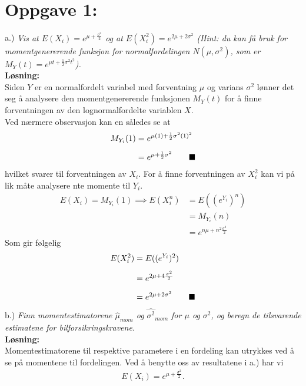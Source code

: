 \documentclass[12pt,
               a4paper,
               article,
               oneside,
               oldfontcommands,
               norsk]{memoir}
\newcommand{\Q}{ \qquad \hfill \blacksquare}
\begin{document}
\section*{Oppgave 1:}
a.) \emph{Vis at $E(X_i) = e^{\mu + \frac{\sigma^2}{2}}$ og at 
    $E(X_{i}^{2}) = e^{2\mu + 2\sigma^2}$ 
(Hint: du kan få bruk for momentgenererende funksjon for normalfordelingen 
$N(\mu, \sigma^2)$, som er $M_{Y}(t) = e^{\mu t+ \frac{1}{2} \sigma^2 t^2}$).}\vspace{3mm}\\
\textbf{Løsning:}\vspace{3mm}\\
Siden $Y$ er en normalfordelt variabel med forventning $\mu$ og varians $\sigma^2$ lønner det seg å analysere den momentgenererende funksjonen $M_{Y}(t)$ for å finne forventningen av den lognormalfordelte variablen $X$.\\
    Ved nærmere observasjon kan en således se at 
\begin{align*}
        M_{Y_i}(1) &= e^{\mu (1) + \frac{1}{2}\sigma^2(1)^2}\\[5pt]
                   &= e^{\mu + \frac{1}{2}\sigma^2}  \Q
\end{align*}
hvilket svarer til forventningen av $X_i$. For å finne forventningen av $X_{i}^2$ kan vi på lik måte analysere nte momente til $Y_i$.
\begin{align*}
E(X_{i}) = M_{Y_{i}}(1) \implies E(X_{i}^n) &= E((e^{Y_{i}})^n)\\[5pt]
&=
    M_{Y_{i}}(n)\\[5pt]
    &=
        e^{n\mu + n^2\frac{\sigma^2}{2}} 
\end{align*}
Som gir følgelig
\begin{align*}
    E(X_{i}^2) &= E((e^{Y_{i}})^2) \\[5pt]
               &= e^{2 \mu + 4 \frac{\sigma^2}{2}}\\[5pt]
               &= e^{2 \mu + 2 \sigma^2} \Q
\end{align*}
b.) \emph{Finn momentestimatorene $\hat{\mu}_{mom}$ og $\hat{\sigma^2}_{mom}$ for $\mu$ og $\sigma^2$, og beregn de tilsvarende estimatene for bilforsikringskravene.
}\vspace{3mm}\\
\textbf{Løsning:}\vspace{3mm}\\
Momentestimatorene til respektive parametere i en fordeling kan utrykkes ved å se på momentene til fordelingen. Ved å benytte oss av resultatene i a.) har vi 
\begin{align*} 
    E(X_i) = e^{\mu + \frac{\sigma^2}{2}}.  
\end{align*}
\end{document}
